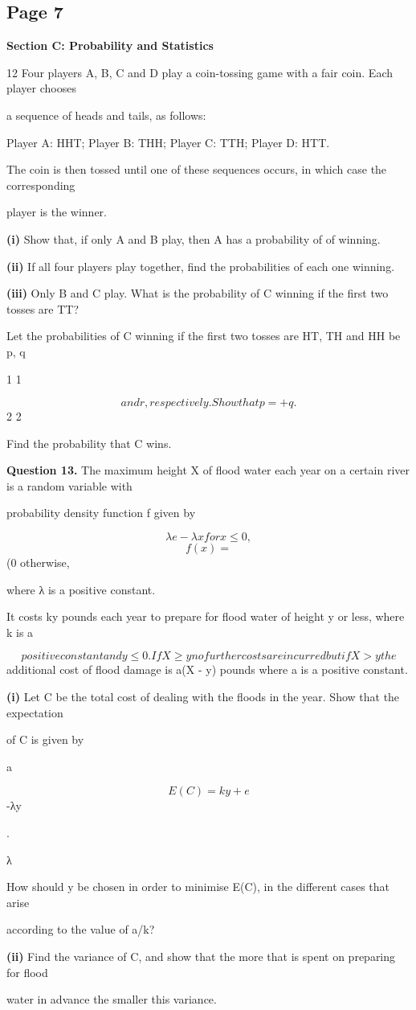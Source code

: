 \documentclass[12pt]{article}
\begin{document}
\subsection*{Page 7}
\begin{flushleft}
\bigskip\textbf{Section C: Probability and Statistics}\par
12 Four players A, B, C and D play a coin-tossing game with a fair coin. Each player chooses\par
a sequence of heads and tails, as follows:\par
Player A: HHT; Player B: THH; Player C: TTH; Player D: HTT.\par
The coin is then tossed until one of these sequences occurs, in which case the corresponding\par
player is the winner.\par
\textbf{(i)} Show that, if only A and B play, then A has a probability of of winning.\par
\textbf{(ii)} If all four players play together, find the probabilities of each one winning.\par
\textbf{(iii)} Only B and C play. What is the probability of C winning if the first two tosses are TT?\par
Let the probabilities of C winning if the first two tosses are HT, TH and HH be p, q\par
1 1\par
\[and r, respectively. Show that p = + q.\]
2 2\par
Find the probability that C wins.\par
\bigskip\textbf{Question 13.} The maximum height X of flood water each year on a certain river is a random variable with\par
probability density function f given by\par
\[λe -λx for x \leq 0 ,\]
\[f(x) =\]
(0 otherwise,\par
where λ is a positive constant.\par
It costs ky pounds each year to prepare for flood water of height y or less, where k is a\par
\[positive constant and y \leq 0. If X \geq y no further costs are incurred but if X > y the\]
additional cost of flood damage is a(X - y) pounds where a is a positive constant.\par
\textbf{(i)} Let C be the total cost of dealing with the floods in the year. Show that the expectation\par
of C is given by\par
a\par
\[E(C) = ky + e\]
-λy\par
.\par
λ\par
How should y be chosen in order to minimise E(C), in the different cases that arise\par
according to the value of a/k?\par
\textbf{(ii)} Find the variance of C, and show that the more that is spent on preparing for flood\par
water in advance the smaller this variance.\par
\end{flushleft}
\end{document}
